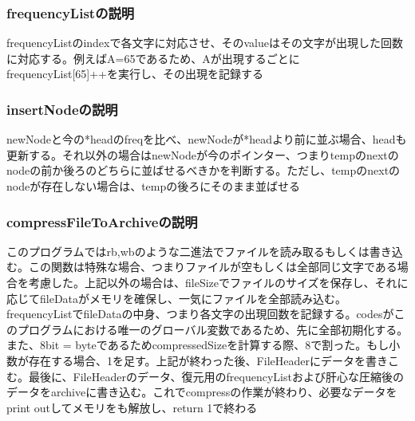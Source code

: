 \subsubsection{frequencyListの説明}
frequencyListのindexで各文字に対応させ、そのvalueはその文字が出現した回数に対応する。例えばA=65であるため、Aが出現するごとにfrequencyList[65]++を実行し、その出現を記録する

\subsubsection{insertNodeの説明}
newNodeと今の*headのfreqを比べ、newNodeが*headより前に並ぶ場合、headも更新する。それ以外の場合はnewNodeが今のポインター、つまりtempのnextのnodeの前か後ろのどちらに並ばせるべきかを判断する。ただし、tempのnextのnodeが存在しない場合は、tempの後ろにそのまま並ばせる
\subsubsection{compressFileToArchiveの説明}
このプログラムではrb,wbのような二進法でファイルを読み取るもしくは書き込む。この関数は特殊な場合、つまりファイルが空もしくは全部同じ文字である場合を考慮した。上記以外の場合は、fileSizeでファイルのサイズを保存し、それに応じてfileDataがメモリを確保し、一気にファイルを全部読み込む。frequencyListでfileDataの中身、つまり各文字の出現回数を記録する。codesがこのプログラムにおける唯一のグローバル変数であるため、先に全部初期化する。また、8bit = byteであるためcompressedSizeを計算する際、8で割った。もし小数が存在する場合、1を足す。上記が終わった後、FileHeaderにデータを書きこむ。最後に、FileHeaderのデータ、復元用のfrequencyListおよび肝心な圧縮後のデータをarchiveに書き込む。これでcompressの作業が終わり、必要なデータをprint outしてメモリをも解放し、return 1で終わる

